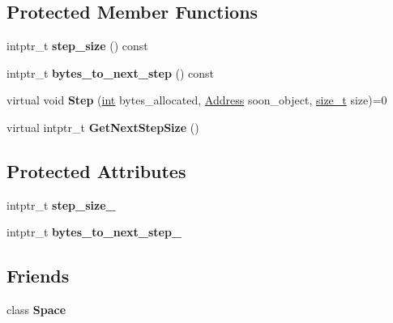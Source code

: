 \subsection*{Protected Member Functions}
\begin{DoxyCompactItemize}
\item 
\mbox{\label{classv8_1_1internal_1_1AllocationObserver_a34d92b5b7db58528cbcbace883ca43d4}} 
intptr\+\_\+t {\bfseries step\+\_\+size} () const
\item 
\mbox{\label{classv8_1_1internal_1_1AllocationObserver_a7bdb2960ee3bc34da0a6908d3a87e1d0}} 
intptr\+\_\+t {\bfseries bytes\+\_\+to\+\_\+next\+\_\+step} () const
\item 
\mbox{\label{classv8_1_1internal_1_1AllocationObserver_a41118152d2c9a9834a486eccf08043a5}} 
virtual void {\bfseries Step} (\mbox{\hyperlink{classint}{int}} bytes\+\_\+allocated, \mbox{\hyperlink{classuintptr__t}{Address}} soon\+\_\+object, \mbox{\hyperlink{classsize__t}{size\+\_\+t}} size)=0
\item 
\mbox{\label{classv8_1_1internal_1_1AllocationObserver_a91fb6ffe2d4b42ff7b4221dad89db465}} 
virtual intptr\+\_\+t {\bfseries Get\+Next\+Step\+Size} ()
\end{DoxyCompactItemize}
\subsection*{Protected Attributes}
\begin{DoxyCompactItemize}
\item 
\mbox{\label{classv8_1_1internal_1_1AllocationObserver_aca0c9295ca497a26f08cd8244f84d5aa}} 
intptr\+\_\+t {\bfseries step\+\_\+size\+\_\+}
\item 
\mbox{\label{classv8_1_1internal_1_1AllocationObserver_a5f02cbcbd88c5b87439c31ada838923e}} 
intptr\+\_\+t {\bfseries bytes\+\_\+to\+\_\+next\+\_\+step\+\_\+}
\end{DoxyCompactItemize}
\subsection*{Friends}
\begin{DoxyCompactItemize}
\item 
\mbox{\label{classv8_1_1internal_1_1AllocationObserver_a2129e6c0ac73536a2ac4f681dae16947}} 
class {\bfseries Space}
\end{DoxyCompactItemize}


